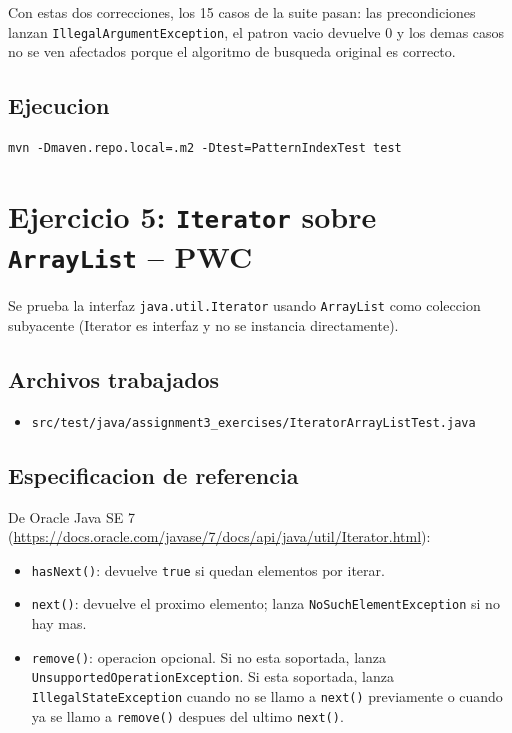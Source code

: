 \documentclass[12pt,a4paper]{article}
\begin{document}
Con estas dos correcciones, los 15 casos de la suite pasan: las precondiciones lanzan
\texttt{IllegalArgumentException}, el patron vacio devuelve 0 y los demas casos no se ven
afectados porque el algoritmo de busqueda original es correcto.

\subsection{Ejecucion}

\begin{lstlisting}[style=codestyle]
mvn -Dmaven.repo.local=.m2 -Dtest=PatternIndexTest test
\end{lstlisting}

\section{Ejercicio 5: \texttt{Iterator} sobre \texttt{ArrayList} -- PWC}

Se prueba la interfaz \texttt{java.util.Iterator} usando \texttt{ArrayList} como coleccion
subyacente (Iterator es interfaz y no se instancia directamente).

\subsection{Archivos trabajados}

\begin{itemize}
  \item \texttt{src/test/java/assignment3\_exercises/IteratorArrayListTest.java}
\end{itemize}

\subsection{Especificacion de referencia}

De Oracle Java SE 7 (\url{https://docs.oracle.com/javase/7/docs/api/java/util/Iterator.html}):

\begin{itemize}
  \item \texttt{hasNext()}: devuelve \texttt{true} si quedan elementos por iterar.
  \item \texttt{next()}: devuelve el proximo elemento; lanza \texttt{NoSuchElementException} si no
  hay mas.
  \item \texttt{remove()}: operacion opcional. Si no esta soportada, lanza
  \texttt{UnsupportedOperationException}. Si esta soportada, lanza \texttt{IllegalStateException}
  cuando no se llamo a \texttt{next()} previamente o cuando ya se llamo a \texttt{remove()}
  despues del ultimo \texttt{next()}.
\end{itemize}
\end{document}
